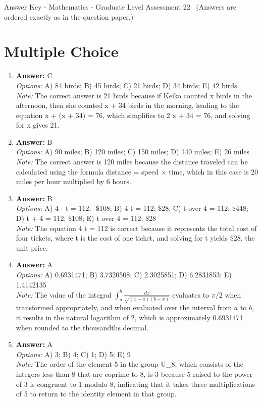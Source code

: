 \documentclass[12pt]{article}
\begin{document}
\begin{center}
Answer Key - Mathematics - Graduate Level Assessment 22 \
\small (Answers are ordered exactly as in the question paper.)
\end{center}

\section*{Multiple Choice}
\begin{enumerate}[label=\arabic*.]
\item \textbf{Answer:} C
\\ \textit{Options:} A) 84 birds; B) 45 birds; C) 21 birds; D) 34 birds; E) 42 birds
\\ \textit{Note:} The correct answer is 21 birds because if Keiko counted x birds in the afternoon, then she counted x + 34 birds in the morning, leading to the equation x + (x + 34) = 76, which simplifies to 2 x + 34 = 76, and solving for x gives 21.
\item \textbf{Answer:} B
\\ \textit{Options:} A) 90 miles; B) 120 miles; C) 150 miles; D) 140 miles; E) 26 miles
\\ \textit{Note:} The correct answer is 120 miles because the distance traveled can be calculated using the formula distance = speed × time, which in this case is 20 miles per hour multiplied by 6 hours.
\item \textbf{Answer:} B
\\ \textit{Options:} A) 4 - t = 112; -\$108; B) 4 t = 112; \$28; C) t over 4 = 112; \$448; D) t + 4 = 112; \$108; E) t over 4 = 112; \$28
\\ \textit{Note:} The equation 4 t = 112 is correct because it represents the total cost of four tickets, where t is the cost of one ticket, and solving for t yields \$28, the unit price.
\item \textbf{Answer:} A
\\ \textit{Options:} A) 0.6931471; B) 3.7320508; C) 2.3025851; D) 6.2831853; E) 1.4142135
\\ \textit{Note:} The value of the integral \(\int_a^b \frac{dx}{\sqrt{(x-a)(b-x)}}\) evaluates to \(\pi/2\) when transformed appropriately, and when evaluated over the interval from \(a\) to \(b\), it results in the natural logarithm of 2, which is approximately 0.6931471 when rounded to the thousandths decimal.
\item \textbf{Answer:} A
\\ \textit{Options:} A) 3; B) 4; C) 1; D) 5; E) 9
\\ \textit{Note:} The order of the element 5 in the group U\_8, which consists of the integers less than 8 that are coprime to 8, is 3 because 5 raised to the power of 3 is congruent to 1 modulo 8, indicating that it takes three multiplications of 5 to return to the identity element in that group.
\end{enumerate}
\end{document}
